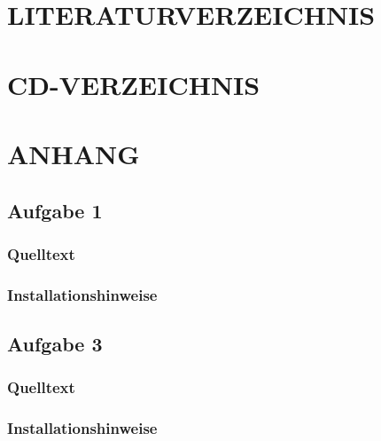 \documentclass[a4paper,12pt]{article}
\begin{document}
\newpage
\section{LITERATURVERZEICHNIS}

%
%    



\newpage
\section{CD-VERZEICHNIS}


\newpage
\section{ANHANG}
\subsection{Aufgabe 1}
\subsubsection{Quelltext}
\subsubsection{Installationshinweise}

\subsection{Aufgabe 3}
\subsubsection{Quelltext}
\subsubsection{Installationshinweise}
\end{document}
